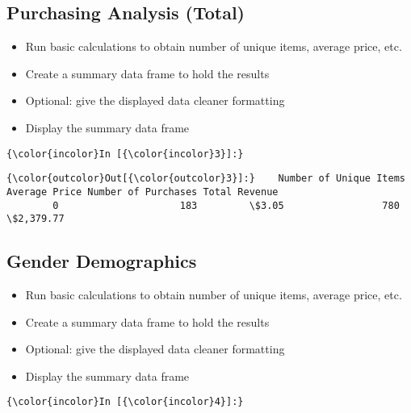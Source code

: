 \documentclass[11pt]{article}
\begin{document}
    \subsection{Purchasing Analysis
(Total)}\label{purchasing-analysis-total}

    \begin{itemize}
\item
  Run basic calculations to obtain number of unique items, average
  price, etc.
\item
  Create a summary data frame to hold the results
\item
  Optional: give the displayed data cleaner formatting
\item
  Display the summary data frame
\end{itemize}

    \begin{Verbatim}[commandchars=\\\{\}]
{\color{incolor}In [{\color{incolor}3}]:} 
\end{Verbatim}


\begin{Verbatim}[commandchars=\\\{\}]
{\color{outcolor}Out[{\color{outcolor}3}]:}    Number of Unique Items Average Price Number of Purchases Total Revenue
        0                     183         \$3.05                 780     \$2,379.77
\end{Verbatim}
            
    \subsection{Gender Demographics}\label{gender-demographics}

    \begin{itemize}
\item
  Run basic calculations to obtain number of unique items, average
  price, etc.
\item
  Create a summary data frame to hold the results
\item
  Optional: give the displayed data cleaner formatting
\item
  Display the summary data frame
\end{itemize}

    \begin{Verbatim}[commandchars=\\\{\}]
{\color{incolor}In [{\color{incolor}4}]:} 
\end{Verbatim}
\end{document}
